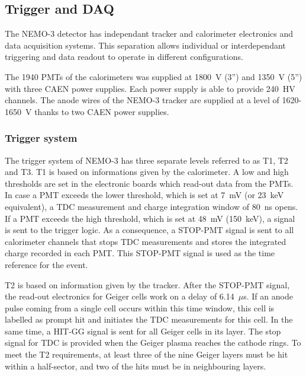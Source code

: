 \documentclass[main.tex]{subfiles}
\begin{document}
\FloatBarrier


\subsection{Trigger and DAQ}\label{sec:triggerAndDAQ}


\NI The NEMO-3 detector has independant tracker and calorimeter electronics and data acquisition systems. This separation allows individual or interdependant triggering and data readout to operate in different configurations. 


\bigskip


\NI The 1940 PMTs of the calorimeters was supplied at 1800~V (3'') and 1350~V (5'') with three CAEN power supplies. Each power supply is able to provide 240~HV channels. The anode wires of the NEMO-3 tracker are supplied at a level of 1620-1650~V thanks to two CAEN power supplies. 


\subsubsection{Trigger system}


\NI The trigger system of NEMO-3 has three separate levels referred to as T1, T2 and T3. T1 is based on informations given by the calorimeter. A low and high thresholds are set in the electronic boards which read-out data from the PMTs. In case a PMT exceeds the lower threshold, which is set at 7~mV (or 23~keV equivalent), a TDC measurement and charge integration window of 80~ns opens. If a PMT exceeds the high threshold, which is set at 48~mV (150~keV), a signal is sent to the trigger logic. As a consequence, a STOP-PMT signal is sent to all calorimeter channels that stops TDC measurements and stores the integrated charge recorded in each PMT. This STOP-PMT signal is used as the time reference for the event.


\bigskip


\NI T2 is based on information given by the tracker. After the STOP-PMT signal, the read-out electronics for Geiger cells work on a delay of 6.14~$\mu$s. If an anode pulse coming from a single cell occurs within this time window, this cell is labelled as prompt hit and initiates the TDC measurements for this cell. In the same time, a HIT-GG signal is sent for all Geiger cells in its layer. The stop signal for TDC is provided when the Geiger plasma reaches the cathode rings. To meet the T2 requirements, at least three of the nine Geiger layers must be hit within a half-sector, and two of the hits must be in neighbouring layers.
\end{document}
